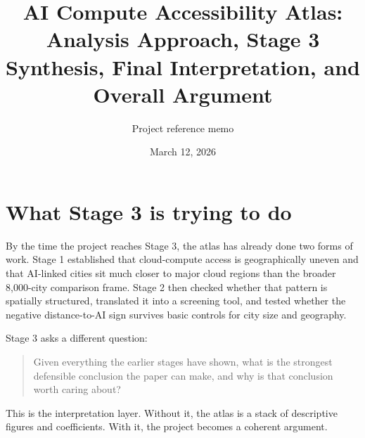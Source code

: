 \documentclass[11pt]{article}
\title{\textbf{AI Compute Accessibility Atlas:}\\
\large Analysis Approach, Stage 3 Synthesis, Final Interpretation, and Overall Argument}
\author{Project reference memo}
\date{March 12, 2026}
\begin{document}
\maketitle

\begin{center}
\end{center}

\section{What Stage 3 is trying to do}
By the time the project reaches Stage 3, the atlas has already done two forms of work. Stage 1 established that cloud-compute access is geographically uneven and that AI-linked cities sit much closer to major cloud regions than the broader 8{,}000-city comparison frame. Stage 2 then checked whether that pattern is spatially structured, translated it into a screening tool, and tested whether the negative distance-to-AI sign survives basic controls for city size and geography.

Stage 3 asks a different question:
\begin{quote}
Given everything the earlier stages have shown, what is the strongest defensible conclusion the paper can make, and why is that conclusion worth caring about?
\end{quote}

This is the interpretation layer. Without it, the atlas is a stack of descriptive figures and coefficients. With it, the project becomes a coherent argument.
\end{document}
